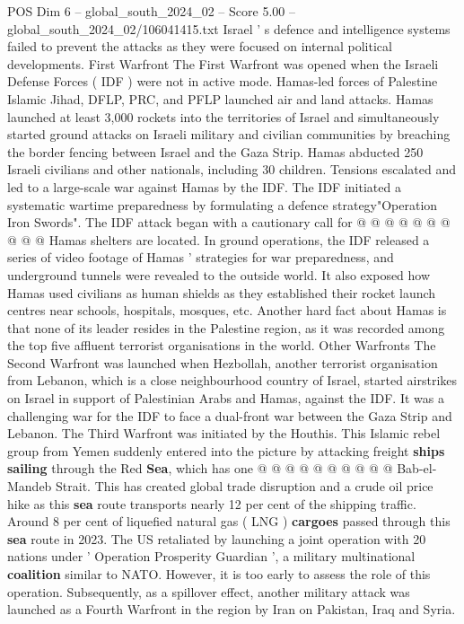 \begin{textsample}{POS Dim 6 – global\_south\_2024\_02 – Score 5.00 – global\_south\_2024\_02/106041415.txt}
Israel ' s defence and intelligence systems failed to prevent the attacks as they were focused on internal political developments.
First Warfront The First Warfront was opened when the Israeli Defense Forces ( IDF ) were not in active mode.
Hamas-led forces of Palestine Islamic Jihad, DFLP, PRC, and PFLP launched air and land attacks.
Hamas launched at least 3,000 rockets into the territories of Israel and simultaneously started ground attacks on Israeli military and civilian communities by breaching the border fencing between Israel and the Gaza Strip.
Hamas abducted 250 Israeli civilians and other nationals, including 30 children.
Tensions escalated and led to a large-scale war against Hamas by the IDF.
The IDF initiated a systematic wartime preparedness by formulating a defence strategy"Operation Iron Swords".
The IDF attack began with a cautionary call for @ @ @ @ @ @ @ @ @ @ Hamas shelters are located.
In ground operations, the IDF released a series of video footage of Hamas ' strategies for war preparedness, and underground tunnels were revealed to the outside world.
It also exposed how Hamas used civilians as human shields as they established their rocket launch centres near schools, hospitals, mosques, etc.
Another hard fact about Hamas is that none of its leader resides in the Palestine region, as it was recorded among the top five affluent terrorist organisations in the world.
Other Warfronts The Second Warfront was launched when Hezbollah, another terrorist organisation from Lebanon, which is a close neighbourhood country of Israel, started airstrikes on Israel in support of Palestinian Arabs and Hamas, against the IDF.
It was a challenging war for the IDF to face a dual-front war between the Gaza Strip and Lebanon.
The Third Warfront was initiated by the Houthis.
This Islamic rebel group from Yemen suddenly entered into the picture by attacking freight \textbf{ships} \textbf{sailing} through the Red \textbf{Sea}, which has one @ @ @ @ @ @ @ @ @ @ Bab-el-Mandeb Strait.
This has created global trade disruption and a crude oil price hike as this \textbf{sea} route transports nearly 12 per cent of the shipping traffic.
Around 8 per cent of liquefied natural gas ( LNG ) \textbf{cargoes} passed through this \textbf{sea} route in 2023.
The US retaliated by launching a joint operation with 20 nations under ' Operation Prosperity Guardian ', a military multinational \textbf{coalition} similar to NATO.
However, it is too early to assess the role of this operation.
Subsequently, as a spillover effect, another military attack was launched as a Fourth Warfront in the region by Iran on Pakistan, Iraq and Syria.

\end{textsample}
